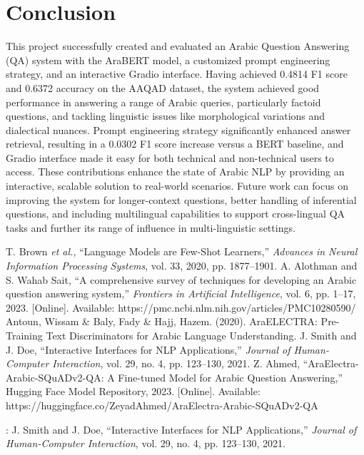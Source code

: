 \documentclass[conference]{IEEEtran}
\begin{document}
\section{Conclusion}
This project successfully created and evaluated an Arabic Question Answering (QA) system with the AraBERT model, a customized prompt engineering strategy, and an interactive Gradio interface. Having achieved 0.4814 F1 score and 0.6372 accuracy on the AAQAD dataset, the system achieved good performance in answering a range of Arabic queries, particularly factoid questions, and tackling linguistic issues like morphological variations and dialectical nuances. Prompt engineering strategy significantly enhanced answer retrieval, resulting in a 0.0302 F1 score increase versus a BERT baseline, and Gradio interface made it easy for both technical and non-technical users to access. These contributions enhance the state of Arabic NLP by providing an interactive, scalable solution to real-world scenarios. Future work can focus on improving the system for longer-context questions, better handling of inferential questions, and including multilingual capabilities to support cross-lingual QA tasks and further its range of influence in multi-linguistic settings.


\begin{thebibliography}{00}
 T. Brown \textit{et al.}, ``Language Models are Few-Shot Learners,'' \textit{Advances in Neural Information Processing Systems}, vol. 33, 2020, pp. 1877--1901.
 A. Alothman and S. Wahab Sait, ``A comprehensive survey of techniques for developing an Arabic question answering system,'' \textit{Frontiers in Artificial Intelligence}, vol. 6, pp. 1--17, 2023. [Online]. Available: https://pmc.ncbi.nlm.nih.gov/articles/PMC10280590/
 Antoun, Wissam & Baly, Fady & Hajj, Hazem. (2020). AraELECTRA: Pre-Training Text Discriminators for Arabic Language Understanding.
 J. Smith and J. Doe, ``Interactive Interfaces for NLP Applications,'' \textit{Journal of Human-Computer Interaction}, vol. 29, no. 4, pp. 123--130, 2021.
 Z. Ahmed, ``AraElectra-Arabic-SQuADv2-QA: A Fine-tuned Model for Arabic Question Answering,'' Hugging Face Model Repository, 2023. [Online]. Available: https://huggingface.co/ZeyadAhmed/AraElectra-Arabic-SQuADv2-QA

: J. Smith and J. Doe, ``Interactive Interfaces for NLP Applications,'' \textit{Journal of Human-Computer Interaction}, vol. 29, no. 4, pp. 123--130, 2021.

\end{thebibliography}
\end{document}
